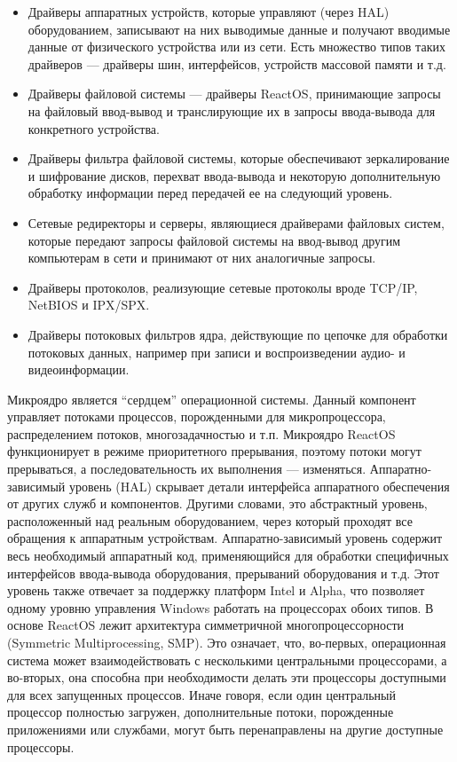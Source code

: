 \begin{itemize}
\item Драйверы аппаратных устройств, которые управляют (через HAL) оборудованием, записывают на них выводимые данные и получают вводимые данные от физического устройства или из сети. Есть множество типов таких драйверов — драйверы шин, интерфейсов, устройств массовой памяти и т.д.
\item Драйверы файловой системы — драйверы ReactOS, принимающие запросы на файловый ввод-вывод и транслирующие их в запросы ввода-вывода для конкретного устройства.
\item Драйверы фильтра файловой системы, которые обеспечивают зеркалирование и шифрование дисков, перехват ввода-вывода и некоторую дополнительную обработку информации перед передачей ее на следующий уровень.
\item Сетевые редиректоры и серверы, являющиеся драйверами файловых систем, которые передают запросы файловой системы на ввод-вывод другим компьютерам в сети и принимают от них аналогичные запросы.
\item Драйверы протоколов, реализующие сетевые протоколы вроде TCP/IP, NetBIOS и IPX/SPX.
\item  Драйверы потоковых фильтров ядра, действующие по цепочке для обработки потоковых данных, например при записи и воспроизведении аудио- и видеоинформации.
\end{itemize}



Микроядро является “сердцем” операционной системы. Данный компонент управляет потоками процессов, порожденными для микропроцессора, распределением потоков, многозадачностью и т.п. Микроядро ReactOS функционирует в режиме приоритетного прерывания, поэтому потоки могут прерываться, а последовательность их выполнения — изменяться.
Аппаратно-зависимый уровень (HAL) скрывает детали интерфейса аппаратного обеспечения от других служб и компонентов. Другими словами, это абстрактный уровень, расположенный над реальным оборудованием, через который проходят все обращения к аппаратным устройствам. Аппаратно-зависимый уровень содержит весь необходимый аппаратный код, применяющийся для обработки специфичных интерфейсов ввода-вывода оборудования, прерываний оборудования и т.д. Этот уровень также отвечает за поддержку платформ Intel и Alpha, что позволяет одному уровню управления Windows работать на процессорах обоих типов.
В основе ReactOS лежит архитектура симметричной многопроцессорности (Symmetric Multiprocessing, SMP). Это означает, что, во-первых, операционная система может взаимодействовать с несколькими центральными процессорами, а во-вторых, она способна при необходимости делать эти процессоры доступными для всех запущенных процессов. Иначе говоря, если один центральный процессор полностью загружен, дополнительные потоки, порожденные приложениями или службами, могут быть перенаправлены на другие доступные процессоры.

